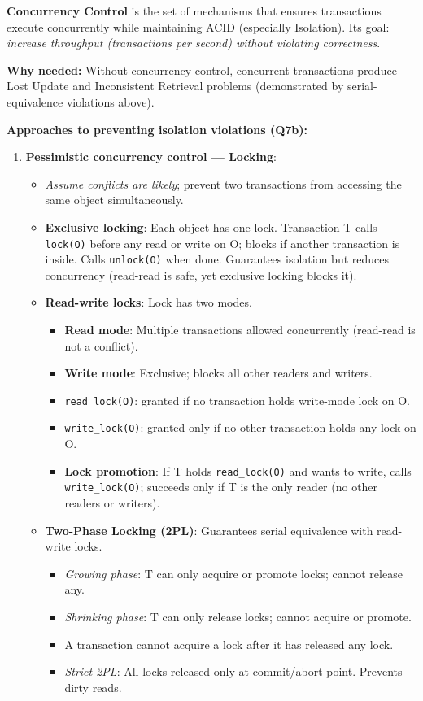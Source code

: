 \documentclass[11pt,a4paper]{article}
\begin{document}
\begin{answerbox}
\textbf{Concurrency Control} is the set of mechanisms that ensures transactions execute concurrently while maintaining ACID (especially Isolation). Its goal: \emph{increase throughput (transactions per second) without violating correctness}.

\textbf{Why needed:} Without concurrency control, concurrent transactions produce Lost Update and Inconsistent Retrieval problems (demonstrated by serial-equivalence violations above).

\bigskip
\textbf{Approaches to preventing isolation violations (Q7b):}

\begin{enumerate}
  \item \textbf{Pessimistic concurrency control --- Locking}:
    \begin{itemize}
      \item \emph{Assume conflicts are likely}; prevent two transactions from accessing the same object simultaneously.
      \item \textbf{Exclusive locking}: Each object has one lock. Transaction T calls \texttt{lock(O)} before any read or write on O; blocks if another transaction is inside. Calls \texttt{unlock(O)} when done. Guarantees isolation but reduces concurrency (read-read is safe, yet exclusive locking blocks it).
      \item \textbf{Read-write locks}: Lock has two modes.
        \begin{itemize}
          \item \textbf{Read mode}: Multiple transactions allowed concurrently (read-read is not a conflict).
          \item \textbf{Write mode}: Exclusive; blocks all other readers and writers.
          \item \texttt{read\_lock(O)}: granted if no transaction holds write-mode lock on O.
          \item \texttt{write\_lock(O)}: granted only if no other transaction holds any lock on O.
          \item \textbf{Lock promotion}: If T holds \texttt{read\_lock(O)} and wants to write, calls \texttt{write\_lock(O)}; succeeds only if T is the only reader (no other readers or writers).
        \end{itemize}
      \item \textbf{Two-Phase Locking (2PL)}: Guarantees serial equivalence with read-write locks.
        \begin{itemize}
          \item \emph{Growing phase}: T can only acquire or promote locks; cannot release any.
          \item \emph{Shrinking phase}: T can only release locks; cannot acquire or promote.
          \item A transaction cannot acquire a lock after it has released any lock.
          \item \emph{Strict 2PL}: All locks released only at commit/abort point. Prevents dirty reads.
        \end{itemize}
    \end{itemize}


\end{enumerate}
\end{answerbox}
\end{document}
